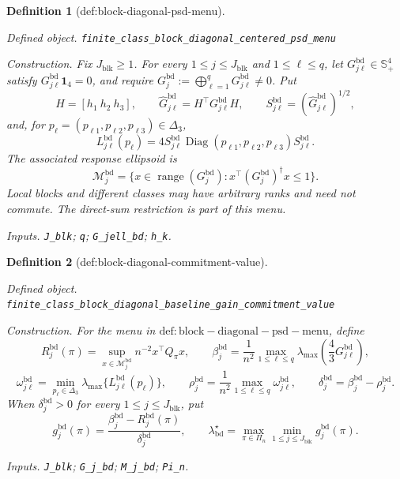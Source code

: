 \documentclass{article}
\newtheorem{definition}{Definition}
\begin{document}
\begin{definition}[def:block-diagonal-psd-menu]\label{def:block-diagonal-psd-menu}
\par\smallskip\noindent\emph{Defined object.} \texttt{finite\_\allowbreak{}class\_\allowbreak{}block\_\allowbreak{}diagonal\_\allowbreak{}centered\_\allowbreak{}psd\_\allowbreak{}menu}
\par\smallskip\noindent\emph{Construction.} Fix \(J_{\mathrm{blk}}\ge1\).  For every \(1\le j\le J_{\mathrm{blk}}\) and \(1\le\ell\le q\), let \(G^{\mathrm{bd}}_{j\ell}\in\mathbb S_+^4\) satisfy \(G^{\mathrm{bd}}_{j\ell}\mathbf 1_4=0\), and require \(G_j^{\mathrm{bd}}:=\bigoplus_{\ell=1}^qG^{\mathrm{bd}}_{j\ell}\ne0\).  Put
\[
H=[h_1\ h_2\ h_3],\qquad
\widehat G^{\mathrm{bd}}_{j\ell}=H^\top G^{\mathrm{bd}}_{j\ell}H,
\qquad
S^{\mathrm{bd}}_{j\ell}=(\widehat G^{\mathrm{bd}}_{j\ell})^{1/2},
\]
and, for \(p_\ell=(p_{\ell1},p_{\ell2},p_{\ell3})\in\Delta_3\),
\[
L^{\mathrm{bd}}_{j\ell}(p_\ell)
=4S^{\mathrm{bd}}_{j\ell}\operatorname{Diag}(p_{\ell1},p_{\ell2},p_{\ell3})S^{\mathrm{bd}}_{j\ell}.
\]
The associated response ellipsoid is
\[
\mathcal M_j^{\mathrm{bd}}
=\{x\in\operatorname{range}(G_j^{\mathrm{bd}}):
x^\top(G_j^{\mathrm{bd}})^\dagger x\le1\}.
\]
Local blocks and different classes may have arbitrary ranks and need not commute.  The direct-sum restriction is part of this menu.
\par\smallskip\noindent\emph{Inputs.} \texttt{J\_\allowbreak{}blk}; \texttt{q}; \texttt{G\_\allowbreak{}jell\_\allowbreak{}bd}; \texttt{h\_\allowbreak{}k}.
\end{definition}

\begin{definition}[def:block-diagonal-commitment-value]\label{def:block-diagonal-commitment-value}
\par\smallskip\noindent\emph{Defined object.} \texttt{finite\_\allowbreak{}class\_\allowbreak{}block\_\allowbreak{}diagonal\_\allowbreak{}baseline\_\allowbreak{}gain\_\allowbreak{}commitment\_\allowbreak{}value}
\par\smallskip\noindent\emph{Construction.} For the menu in \(\mathrm{def:block-diagonal-psd-menu}\), define
\[
R_j^{\mathrm{bd}}(\pi)
=\sup_{x\in\mathcal M_j^{\mathrm{bd}}}n^{-2}x^\top Q_\pi x,
\qquad
\beta_j^{\mathrm{bd}}
=\frac1{n^2}\max_{1\le\ell\le q}
\lambda_{\max}\!\left(\frac43G^{\mathrm{bd}}_{j\ell}\right),
\]
\[
\omega^{\mathrm{bd}}_{j\ell}
=\min_{p_\ell\in\Delta_3}\lambda_{\max}\{L^{\mathrm{bd}}_{j\ell}(p_\ell)\},
\qquad
\rho_j^{\mathrm{bd}}
=\frac1{n^2}\max_{1\le\ell\le q}\omega^{\mathrm{bd}}_{j\ell},
\qquad
\delta_j^{\mathrm{bd}}=\beta_j^{\mathrm{bd}}-\rho_j^{\mathrm{bd}}.
\]
When \(\delta_j^{\mathrm{bd}}>0\) for every \(1\le j\le J_{\mathrm{blk}}\), put
\[
g_j^{\mathrm{bd}}(\pi)
=\frac{\beta_j^{\mathrm{bd}}-R_j^{\mathrm{bd}}(\pi)}{\delta_j^{\mathrm{bd}}},
\qquad
\lambda_{\mathrm{bd}}^\star
=\max_{\pi\in\Pi_n}\min_{1\le j\le J_{\mathrm{blk}}}g_j^{\mathrm{bd}}(\pi).
\]
\par\smallskip\noindent\emph{Inputs.} \texttt{J\_\allowbreak{}blk}; \texttt{G\_\allowbreak{}j\_\allowbreak{}bd}; \texttt{M\_\allowbreak{}j\_\allowbreak{}bd}; \texttt{Pi\_\allowbreak{}n}.
\end{definition}
\end{document}
